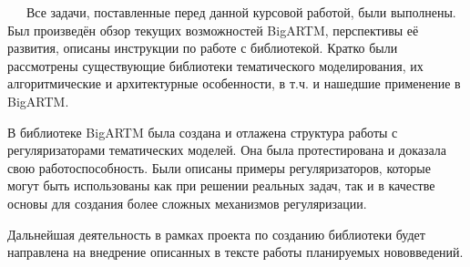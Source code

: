 $\quad\;\:$Все задачи, поставленные перед данной курсовой работой, были выполнены. Был произведён обзор текущих возможностей BigARTM, перспективы её развития, описаны инструкции по работе с библиотекой. Кратко были рассмотрены существующие библиотеки тематического моделирования, их алгоритмические и архитектурные особенности, в т.ч. и нашедшие применение в BigARTM. 

В библиотеке BigARTM была создана и отлажена структура работы с регуляризаторами тематических моделей. Она была протестирована и доказала свою работоспособность. Были описаны примеры регуляризаторов, которые могут быть использованы как при решении реальных задач, так и в качестве основы для создания более сложных механизмов регуляризации.

Дальнейшая деятельность в рамках проекта по созданию библиотеки будет направлена на внедрение описанных в тексте работы планируемых нововведений.